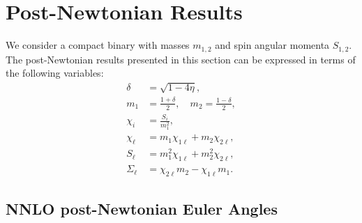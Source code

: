 \documentclass[%
aps,
prd,
amssymb,
amsmath,
amsfonts,
eqsecnum,
showpacs,
nofootinbib,
floatfix,
twocolumn,
twoside,
a4paper,
superscriptaddress
]{revtex4-1}
\begin{document}

\section{Post-Newtonian Results}
We consider a compact binary with masses $m_{1,2}$ and spin angular momenta $S_{1,2}$. The post-Newtonian results presented in this section can be expressed in terms of the following variables:
\begin{align}
    \delta &= \sqrt{1 - 4 \eta}, \\
m_1 &= \frac{1+ \delta}{2}, \quad
m_2 = \frac{1- \delta}{2}, \\
\chi_i &= \frac{S_i}{m^2_1}, \\
\chi_{\ell} &= m_1 \chi_{1 \ell} + m_2 \chi_{2 \ell}, \\
S_{\ell} &= m^2_1 \chi_{1\ell} + m^2_2 \chi_{2 \ell}, \\
\Sigma_{\ell} &= \chi_{2\ell} m_2 - \chi_{1\ell} m_1 .
\end{align}

\subsection{NNLO post-Newtonian Euler Angles}
\label{appendix:nnlo_angles}
\end{document}
